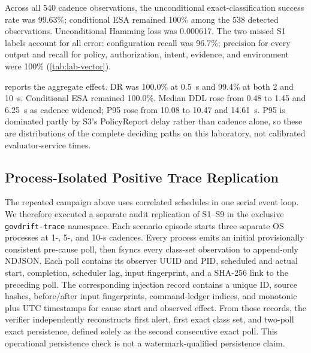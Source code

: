 Across all 540 cadence observations, the unconditional exact-classification success
rate was 99.63\%; conditional ESA remained 100\% among the 538 detected
observations. Unconditional Hamming loss was 0.000617. The two missed S1
labels account for all error: configuration
recall was 96.7\%; precision for every output and recall for policy,
authorization, intent, evidence, and environment were 100\%
(\cref{tab:lab-vector}).

\begin{table}[t]
\centering
\caption{Cadence Sensitivity Across Nine Scenarios and 20 Repetitions. ESA Is
Conditional on Detection; DDL Values Are Seconds.}
\label{tab:lab-cadence}
\footnotesize
\resizebox{\columnwidth}{!}{}
\end{table}

\begin{table}[t]
\centering
\caption{Class-Set Component Metrics Across All Cadences. Evidence Is the
Epistemic Output Triggered by an Undecidable Substantive Component, Not a
Sixth Substantive Distance.}
\label{tab:lab-vector}
\footnotesize
\resizebox{\columnwidth}{!}{}
\end{table}

 reports the aggregate effect. DR was 100.0\% at 0.5~s
and 99.4\% at both 2 and 10~s. Conditional ESA remained 100.0\%. Median DDL
rose from 0.48 to 1.45 and 6.25~s as cadence widened; P95 rose from 10.08 to
10.47 and 14.61~s. P95 is dominated partly by S3's PolicyReport delay rather
than cadence alone, so these are distributions of the complete deciding
paths on this laboratory, not calibrated evaluator-service times.

\subsection{Process-Isolated Positive Trace Replication}
The repeated campaign above uses correlated schedules in one serial event
loop. We therefore executed a separate audit replication of S1--S9 in the
exclusive \texttt{govdrift-trace} namespace. Each scenario episode starts
three separate OS processes at 1-, 5-, and 10-s cadences. Every process emits
an initial provisionally consistent pre-cause poll, then fsyncs every class-set observation
to append-only NDJSON. Each poll contains its observer UUID and PID, scheduled
and actual start, completion, scheduler lag, input fingerprint, and a SHA-256
link to the preceding poll. The corresponding injection record contains a
unique ID, source hashes, before/after input fingerprints, command-ledger
indices, and monotonic plus UTC timestamps for cause start and observed
effect. From those records, the verifier independently reconstructs first
alert, first exact class set, and two-poll exact persistence, defined solely as
the second consecutive exact poll. This operational persistence check is not a
watermark-qualified persistence claim.

